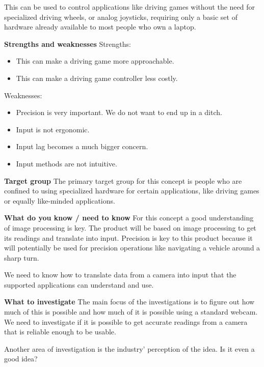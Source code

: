 This can be used to control applications like driving games without the need for specialized driving wheels, or analog joysticks, requiring only a basic set of hardware already available to most people who own a laptop. 
\bigskip

\noindent\textbf{Strengths and weaknesses} \newline
Strengths:
\begin{itemize}
\item This can make a driving game more approachable.
\item This can make a driving game controller less costly.
\end{itemize}
Weaknesses:
\begin{itemize}
\item Precision is very important. We do not want to end up in a ditch.
\item Input is not ergonomic.
\item Input lag becomes a much bigger concern.
\item Input methods are not intuitive.
\end{itemize}
\bigskip

\noindent\textbf{Target group} \newline
The primary target group for this concept is people who are confined to using specialized hardware for certain applications, like driving games or equally like-minded applications.
\bigskip

\noindent\textbf{What do you know / need to know} \newline
For this concept a good understanding of image processing is key. The product will be based on image processing to get its readings and translate into input. Precision is key to this product because it will potentially be used for precision operations like navigating a vehicle around a sharp turn.

We need to know how to translate data from a camera into input that the supported applications can understand and use.
\bigskip

\noindent\textbf{What to investigate} \newline
The main focus of the investigations is to figure out how much of this is possible and how much of it is possible using a standard webcam. We need to investigate if it is possible to get accurate readings from a camera that is reliable enough to be usable.
 
Another area of investigation is the industry’ perception of the idea. Is it even a good idea?

